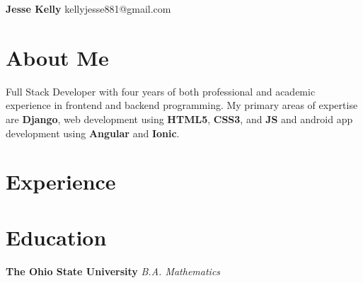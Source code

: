 \documentclass[letterpaper,11pt]{article}
\begin{document}
\begin{flushleft}
\Large\textbf{Jesse Kelly}
\newline
kellyjesse881@gmail.com
\end{flushleft}

\section{About Me}
Full Stack Developer with four years of both
professional and academic experience in frontend
and backend programming. My primary areas of
expertise are \textbf{Django}, web development using \textbf{HTML5},
\textbf{CSS3}, and \textbf{JS} and android app development using
\textbf{Angular} and \textbf{Ionic}.

\section{Experience}

\section{Education}
\textbf{The Ohio State University}
\newline
\textit{B.A. Mathematics}
\end{document}
